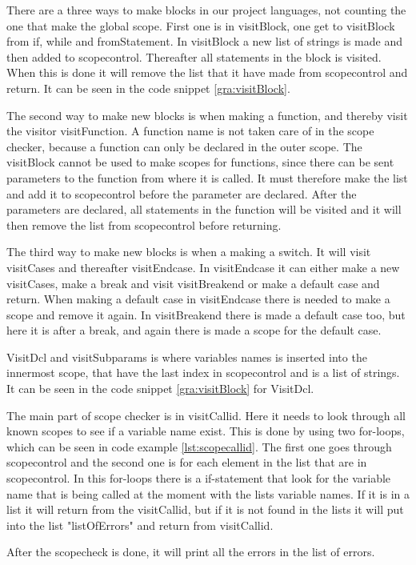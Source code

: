 There are a three ways to make blocks in our project languages, not counting the one that make the global scope. First one is in visitBlock, one get to visitBlock from if, while and fromStatement. In visitBlock a new list of strings is made and then added to scopecontrol. Thereafter all statements in the block is visited. When this is done it will remove the list that it have made from scopecontrol and return. It can be seen in the code snippet \ref{gra:visitBlock}.


The second way to make new blocks is when making a function, and thereby visit the visitor visitFunction. A function name is not taken care of in the scope checker, because a function can only be declared in the outer scope. The visitBlock cannot be used to make scopes for functions, since there can be sent parameters to the function from where it is called. It must therefore make the list and add it to scopecontrol before the parameter are declared. After the parameters are declared, all statements in the function will be visited and it will then remove the list from scopecontrol before returning.

The third way to make new blocks is when a making a switch. It will visit visitCases and thereafter visitEndcase. In visitEndcase it can either make a new visitCases, make a break and visit visitBreakend or make a default case and return. When making a default case in visitEndcase there is needed to make a scope and remove it again. In visitBreakend there is made a default case too, but here it is after a break, and again there is made a scope for the default case.


VisitDcl and visitSubparams is where variables names is inserted into the innermost scope, that have the last index in scopecontrol and is a list of strings. It can be seen in the code snippet \ref{gra:visitBlock} for VisitDcl.


The main part of scope checker is in visitCallid. Here it needs to look through all known scopes to see if a variable name exist. This is done by using two for-loops, which can be seen in code example \ref{lst:scopecallid}. The first one goes through scopecontrol and the second one is for each element in the list that are in scopecontrol. In this for-loops there is a if-statement that look for the variable name that is being called at the moment with the lists variable names. If it is in a list it will return from the visitCallid, but if it is not found in the lists it will put into the list "listOfErrors" and return from visitCallid.


After the scopecheck is done, it will print all the errors in the list of errors.
